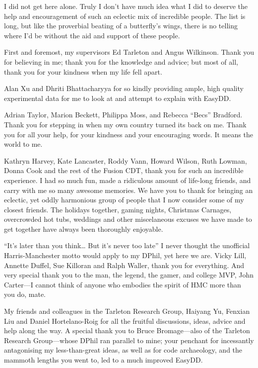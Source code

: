 \begin{frontmatter}[Acknowledgements]

    \begin{justify}
        I did not get here alone. Truly I don't have much idea what I did to deserve the help and encouragement of such an eclectic mix of incredible people. The list is long, but like the proverbial beating of a butterfly's wings, there is no telling where I'd be without the aid and support of these people.

        First and foremost, my supervisors Ed Tarleton and Angus Wilkinson. Thank you for believing in me; thank you for the knowledge and advice; but most of all, thank you for your kindness when my life fell apart.

        Alan Xu and Dhriti Bhattacharyya for so kindly providing ample, high quality experimental data for me to look at and attempt to explain with EasyDD.

        Adrian Taylor, Marion Beckett, Philippa Moss, and Rebecca ``Becs'' Bradford. Thank you for stepping in when my own country turned its back on me. Thank you for all your help, for your kindness and your encouraging words. It means the world to me.

        Kathryn Harvey, Kate Lancaster, Roddy Vann, Howard Wilson, Ruth Lowman, Donna Cook and the rest of the Fusion CDT, thank you for such an incredible experience. I had so much fun, made a ridiculous amount of life-long friends, and carry with me so many awesome memories. We have you to thank for bringing an eclectic, yet oddly harmonious group of people that I now consider some of my closest friends. The holidays together, gaming nights, Christmas Carnages, overcrowded hot tubs, weddings and other miscelaneous excuses we have made to get together have always been thoroughly enjoyable.

        ``It's later than you think\ldots{} But it's never too late'' I never thought the unofficial Harris-Manchester motto would apply to my DPhil, yet here we are. Vicky Lill, Annette Duffel, Sue Killoran and Ralph Waller, thank you for everything. And very special thank you to the man, the legend, the gamer, and college MVP, John Carter---I cannot think of anyone who embodies the spirit of HMC more than you do, mate.

        My friends and colleagues in the Tarleton Research Group, Haiyang Yu, Fenxian Liu and Daniel Hortelano-Roig for all the fruitful discussions, ideas, advice and help along the way. A special thank you to Bruce Bromage---also of the Tarleton Research Group---whose DPhil ran parallel to mine; your penchant for incessantly antagonising my less-than-great ideas, as well as for code archaeology, and the mammoth lengths you went to, led to a much improved EasyDD.


\end{justify}
\end{frontmatter}
